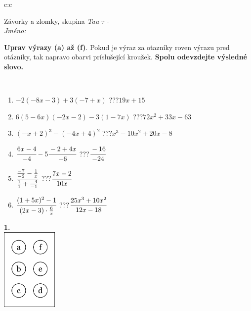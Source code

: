 \documentclass[10pt]{report}
\begin{document}
\begin{tabular}{c:c}
\begin{minipage}[c][104.5mm][t]{0.5\linewidth}
\begin{center}
\vspace{7mm}
{\huge Závorky a zlomky, skupina \textit{Tau $\tau$} -}\\[5mm]
\textit{Jméno:}\phantom{xxxxxxxxxxxxxxxxxxxxxxxxxxxxxxxxxxxxxxxxxxxxxxxxxxxxxxxxxxxxxxxxx}\\[5mm]
\begin{minipage}{0.95\linewidth}
\begin{center}
\textbf{Uprav výrazy (a) až (f)}. Pokud je výraz za otazníky roven výrazu pred otázniky, tak napravo obarvi príslušející kroužek. \textbf{Spolu odevzdejte výsledné slovo.}
\end{center}
\end{minipage}
\\[1mm]
\begin{minipage}{0.79\linewidth}
\begin{center}
\begin{varwidth}{\linewidth}
\begin{enumerate}
\normalsize
\item $-2(-8x-3)+3(-7+x)$\quad \dotfill\; ???\;\dotfill \quad $19x+15$
\item $6(5-6x)(-2x-2)-3(1-7x)$\quad \dotfill\; ???\;\dotfill \quad $72x^2+33x-63$
\item $(-x+2)^3-(-4x+4)^2$\quad \dotfill\; ???\;\dotfill \quad $x^3-10x^2+20x-8$
\item $\cfrac{6x-4}{-4}-5\cfrac{-2+4x}{-6}$\quad \dotfill\; ???\;\dotfill \quad $\cfrac{-16}{-24}$
\item $\cfrac{\frac{-7}{-2}-\frac{1}{x}}{\frac{1}{1}+\frac{-4}{-1}}$\quad \dotfill\; ???\;\dotfill \quad $\cfrac{7x-2}{10x}$
\item $\cfrac{(1+5x)^2-1}{(2x-3)\cdot\frac{6}{x}}$\quad \dotfill\; ???\;\dotfill \quad $\cfrac{25x^3+10x^2}{12x-18}$
\end{enumerate}
\end{varwidth}
\end{center}
\end{minipage}
\begin{minipage}{0.20\linewidth}
\begin{center}
{\Huge\bfseries 1.} \\[2mm]
\includegraphics[height=40mm]{../images/braille.png}

\end{center}
\end{minipage}
\end{center}
\end{minipage}
\end{tabular}
\end{document}
